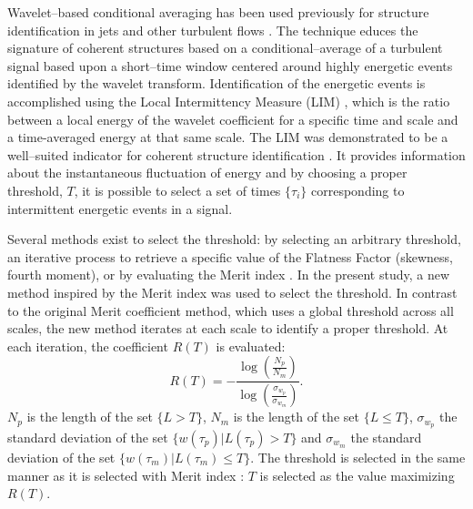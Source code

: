 Wavelet--based conditional averaging has been used previously for structure identification in jets and other turbulent flows \citep{Camussi1997,Camussi1999,Guj1999,Camussi2002,Guj2003}.
The technique educes the signature of coherent structures based on a conditional--average of a turbulent signal based upon a short--time window centered around highly energetic events identified by the wavelet transform.
Identification of the energetic events is accomplished using the Local Intermittency Measure (LIM) \citep{Farge1992}, which is the ratio between a local energy of the wavelet coefficient for a specific time and scale and a time-averaged energy at that same scale.
The LIM was demonstrated to be a well--suited indicator for coherent structure identification \citep{Camussi1997}.
It provides information about the instantaneous fluctuation of energy and by choosing a proper threshold, $T$, it is possible to select a set of times $\{\tau_{i}\}$ corresponding to intermittent energetic events in a signal.

Several methods exist to select the threshold: by selecting an arbitrary threshold, an iterative process to retrieve a specific value of the Flatness Factor (skewness, fourth moment), or by evaluating the Merit index \citep{Grassucci2015}. 
In the present study, a new method inspired by the Merit index was used to select the threshold. 
In contrast to the original Merit coefficient method, which uses a global threshold across all scales, the new method iterates at each scale to identify a proper threshold. At each iteration, the coefficient $R(T)$ is evaluated:
\begin{equation} \label{eqn:tEvaluation}
R(T) = -\frac{\log\left(\frac{N_p}{N_m}\right)}{\log\left(\frac{\sigma_{w_p}}{\sigma_{w_m}}\right)}.
\end{equation} 
$N_p$ is the length of the set $\{L > T\}$, $N_m$ is the length of the set $\{L \leqslant T\}$, $\sigma_{w_p}$ the standard deviation of the set $\{w\left( \tau_p\right) | L\left( \tau_p \right) > T\}$ and $\sigma_{w_m}$ the standard deviation of the set $\{w\left( \tau_m\right) | L\left( \tau_m \right) \leqslant T\}$. The threshold is selected in the same manner as it is selected with Merit index \citep{Grassucci2015}: $T$ is selected as the value maximizing $R(T)$.

